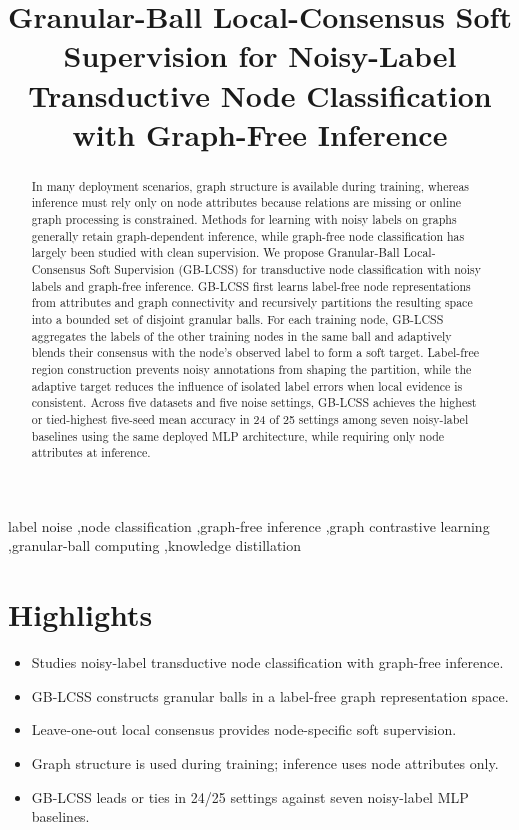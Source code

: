 \documentclass[preprint,12pt]{elsarticle}
\begin{document}
\begin{frontmatter}
\title{Granular-Ball Local-Consensus Soft Supervision for Noisy-Label Transductive Node Classification with Graph-Free Inference}
\begin{abstract}
In many deployment scenarios, graph structure is available during training, whereas inference must rely only on node attributes because relations are missing or online graph processing is constrained. Methods for learning with noisy labels on graphs generally retain graph-dependent inference, while graph-free node classification has largely been studied with clean supervision. We propose Granular-Ball Local-Consensus Soft Supervision (GB-LCSS) for transductive node classification with noisy labels and graph-free inference. GB-LCSS first learns label-free node representations from attributes and graph connectivity and recursively partitions the resulting space into a bounded set of disjoint granular balls. For each training node, GB-LCSS aggregates the labels of the other training nodes in the same ball and adaptively blends their consensus with the node's observed label to form a soft target. Label-free region construction prevents noisy annotations from shaping the partition, while the adaptive target reduces the influence of isolated label errors when local evidence is consistent. Across five datasets and five noise settings, GB-LCSS achieves the highest or tied-highest five-seed mean accuracy in 24 of 25 settings among seven noisy-label baselines using the same deployed MLP architecture, while requiring only node attributes at inference.
\end{abstract}
\begin{keyword}
label noise \sep node classification \sep graph-free inference \sep graph contrastive learning \sep granular-ball computing \sep knowledge distillation
\end{keyword}
\end{frontmatter}

\section*{Highlights}
\begin{itemize}
\item Studies noisy-label transductive node classification with graph-free inference.
\item GB-LCSS constructs granular balls in a label-free graph representation space.
\item Leave-one-out local consensus provides node-specific soft supervision.
\item Graph structure is used during training; inference uses node attributes only.
\item GB-LCSS leads or ties in 24/25 settings against seven noisy-label MLP baselines.
\end{itemize}
\end{document}
